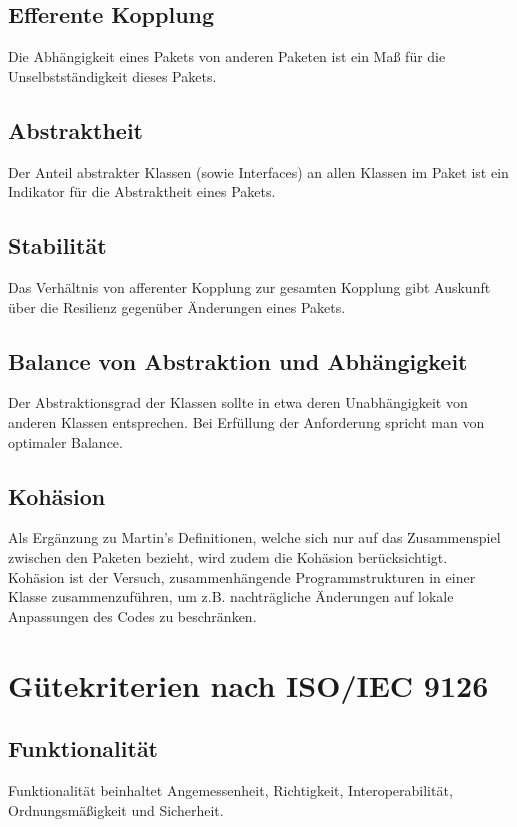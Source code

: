 \documentclass[10pt]{scrreprt}
\begin{document}
\subsection*{Efferente Kopplung}
Die Abhängigkeit eines Pakets von anderen Paketen ist ein Maß für die Unselbstständigkeit dieses Pakets.

\subsection*{Abstraktheit}
Der Anteil abstrakter Klassen (sowie Interfaces) an allen Klassen im Paket ist ein Indikator für die Abstraktheit eines Pakets.

\subsection*{Stabilität}
Das Verhältnis von afferenter Kopplung zur gesamten Kopplung gibt Auskunft über die Resilienz gegenüber Änderungen eines Pakets.

\subsection*{Balance von Abstraktion und Abhängigkeit}
Der Abstraktionsgrad der Klassen sollte in etwa deren Unabhängigkeit von anderen Klassen entsprechen. Bei Erfüllung der Anforderung spricht man von optimaler Balance.

\subsection*{Kohäsion}
Als Ergänzung zu Martin's Definitionen, welche sich nur auf das Zusammenspiel zwischen den Paketen bezieht, wird zudem die Kohäsion berücksichtigt.\\

Kohäsion ist der Versuch, zusammenhängende Programmstrukturen in einer Klasse zusammenzuführen, um z.B. nachträgliche Änderungen auf lokale Anpassungen des Codes zu beschränken.


\section{Gütekriterien nach ISO/IEC 9126}
\subsection*{Funktionalität}
Funktionalität beinhaltet Angemessenheit, Richtigkeit, Interoperabilität, Ordnungsmäßigkeit und Sicherheit.
\end{document}
